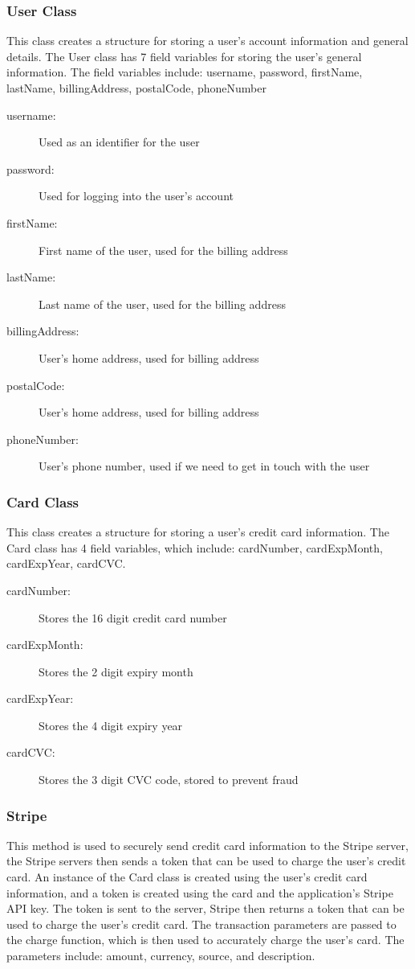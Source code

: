 \documentclass[12pt, titlepage]{article}
\begin{document}
\subsubsection{User Class}
This class creates a structure for storing a user's account information and general details. The User class has 7 field variables for storing the user's general information. The field variables include: username, password, firstName, lastName, billingAddress, postalCode, phoneNumber

\begin{description}
  \item[username:] Used as an identifier for the user 
  \item[password:] Used for logging into the user's account 
  \item[firstName:] First name of the user, used for the billing address
  \item[lastName:] Last name of the user, used for the billing address
  \item[billingAddress:] User's home address, used for billing address
  \item[postalCode:] User's home address, used for billing address
  \item[phoneNumber:] User's phone number, used if we need to get in touch with the user
\end{description}

\subsubsection{Card Class}
This class creates a structure for storing a user's credit card information. The Card class has 4 field variables, which include: cardNumber, cardExpMonth, cardExpYear, cardCVC.

\begin{description}
  \item[cardNumber:] Stores the 16 digit credit card number 
  \item[cardExpMonth:] Stores the 2 digit expiry month 
  \item[cardExpYear:] Stores the 4 digit expiry year
  \item[cardCVC:] Stores the 3 digit CVC code, stored to prevent fraud
\end{description}

\subsubsection{Stripe}
This method is used to securely send credit card information to the Stripe server, the Stripe servers then sends a token that can be used to charge the user's credit card. An instance of the Card class is created using the user's credit card information, and a token is created
using the card and the application's Stripe API key. The token is sent to the server, Stripe then returns a token that can be used to charge the user's credit card. The transaction parameters are passed to the charge function, which is then used to accurately charge the user's card.
The parameters include: amount, currency, source, and description.
  
\end{document}
